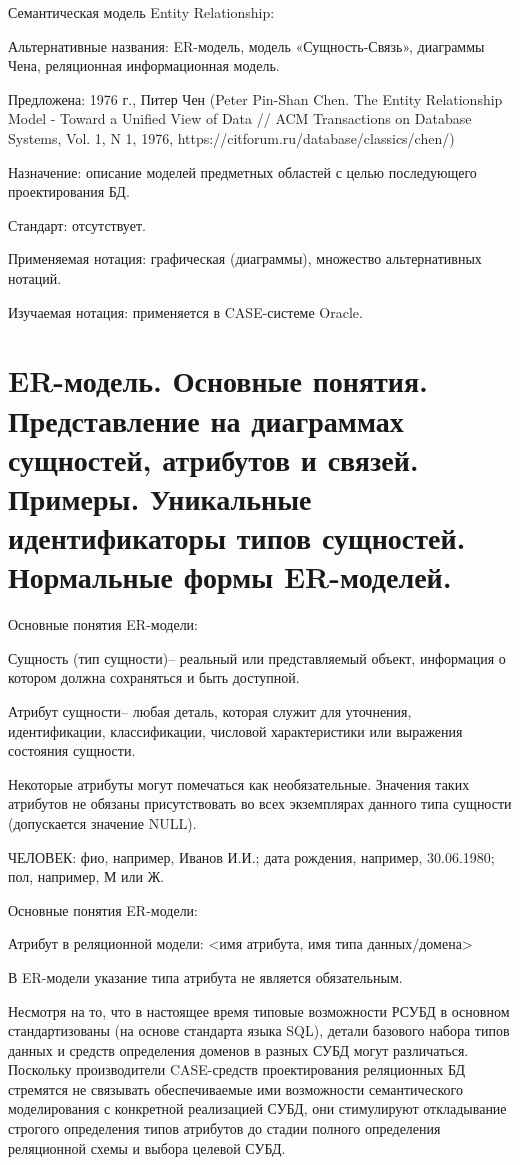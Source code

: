 \documentclass[a4paper,12pt]{article}
\begin{document}
Семантическая модель Entity Relationship:

Альтернативные названия: ER-модель, модель 
«Сущность-Связь», диаграммы Чена, реляционная 
информационная модель.

Предложена: 1976 г., Питер Чен (Peter Pin-Shan Chen. The Entity
Relationship Model - Toward a Unified View of Data // ACM Transactions on Database 
Systems, Vol. 1, N 1, 1976, https://citforum.ru/database/classics/chen/)

Назначение: описание моделей предметных областей с 
целью последующего проектирования БД.

Стандарт: отсутствует.

Применяемая нотация: графическая (диаграммы), 
множество альтернативных нотаций.

Изучаемая нотация: применяется в CASE-системе Oracle.

\section{ER-модель. Основные понятия. Представление на диаграммах сущностей, атрибутов и связей. Примеры. Уникальные идентификаторы типов сущностей. Нормальные формы ER-моделей.}

Основные понятия ER-модели:

Сущность (тип сущности)– реальный или представляемый объект, 
информация о котором должна сохраняться и быть доступной.

Атрибут сущности– любая деталь, которая служит для уточнения, 
идентификации, классификации, числовой характеристики или выражения 
состояния сущности.

Некоторые атрибуты могут помечаться как необязательные. Значения таких 
атрибутов не обязаны присутствовать во всех экземплярах данного типа 
сущности (допускается значение NULL).

ЧЕЛОВЕК: фио, например, Иванов И.И.; дата рождения, например, 
30.06.1980; пол, например, М или Ж.

Основные понятия ER-модели:

Атрибут в реляционной модели: <имя атрибута, имя типа данных/домена>

В ER-модели указание типа атрибута не является обязательным.

Несмотря на то, что в настоящее время типовые возможности РСУБД в 
основном стандартизованы (на основе стандарта языка SQL), детали 
базового набора типов данных и средств определения доменов в разных 
СУБД могут различаться. Поскольку производители CASE-средств 
проектирования реляционных БД стремятся не связывать обеспечиваемые 
ими возможности семантического моделирования с конкретной 
реализацией СУБД, они стимулируют откладывание строгого определения 
типов атрибутов до стадии полного определения реляционной схемы и 
выбора целевой СУБД.
\end{document}
